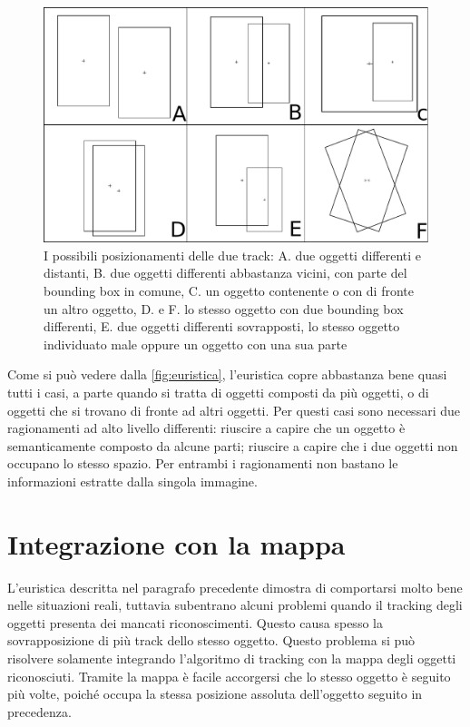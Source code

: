 \begin{figure}[ht]
  \includegraphics[width=\textwidth]{diagrammi/Euristica}
  \caption[Euristica del tracker]{I possibili posizionamenti delle due track: A. due oggetti differenti e distanti, B. due oggetti differenti abbastanza vicini, con parte del bounding box in comune, C. un oggetto contenente o con di fronte un altro oggetto, D. e F. lo stesso oggetto con due bounding box differenti, E. due oggetti differenti sovrapposti, lo stesso oggetto individuato male oppure un oggetto con una sua parte}
  \label{fig:euristica}
\end{figure}

Come si può vedere dalla \autoref{fig:euristica}, l'euristica copre abbastanza bene quasi tutti i casi, a parte quando si tratta di oggetti composti da più oggetti, o di oggetti che si trovano di fronte ad altri oggetti. Per questi casi sono necessari due ragionamenti ad alto livello differenti: riuscire a capire che un oggetto è semanticamente composto da alcune parti; riuscire a capire che i due oggetti non occupano lo stesso spazio. Per entrambi i ragionamenti non bastano le informazioni estratte dalla singola immagine.

\section{Integrazione con la mappa}
L'euristica descritta nel paragrafo precedente dimostra di comportarsi molto bene nelle situazioni reali, tuttavia subentrano alcuni problemi quando il tracking degli oggetti presenta dei mancati riconoscimenti. Questo causa spesso la sovrapposizione di più track dello stesso oggetto. Questo problema si può risolvere solamente integrando l'algoritmo di tracking con la mappa degli oggetti riconosciuti. Tramite la mappa è facile accorgersi che lo stesso oggetto è seguito più volte, poiché occupa la stessa posizione assoluta dell'oggetto seguito in precedenza.

